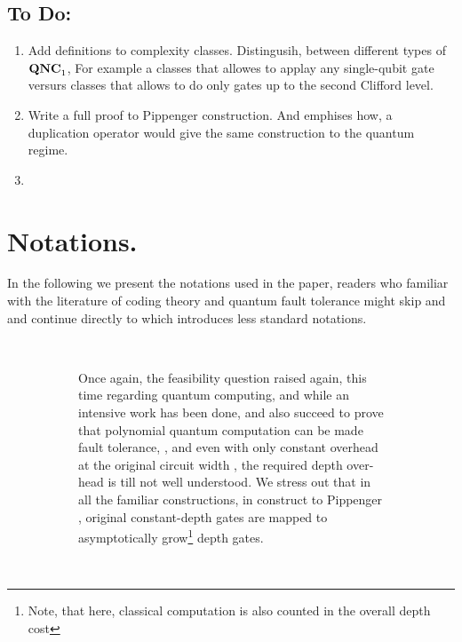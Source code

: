 \documentclass[manuscript,screen,review]{acmart}
\begin{document}
{  \subsection{To Do:}
  \begin{enumerate}
    \item Add definitions to complexity classes. Distingusih, between different types of $\mathbf{QNC}_{1}$, For example a classes that allowes to applay any single-qubit gate versurs classes that allows to do only gates up to the second Clifford level. 
    \item Write a full proof to Pippenger construction. And emphises how, a duplication operator would give the same construction to the quantum regime.  
    \item 
  \end{enumerate}

  \section{ Notations. } In the following we present the notations used in the paper, readers who familiar with the literature of coding theory and quantum fault tolerance might skip  and  and continue directly to  which introduces less standard notations. 




  \begin{figure}[h]
\begin{subfigure}[h]{0.05\textwidth}
      \
    \end{subfigure}
    \begin{subfigure}[h]{0.45\textwidth}

  Once again, the feasibility question raised again, this time regarding quantum computing, and while an intensive work has been done, and also succeed to prove that polynomial quantum computation can be made fault tolerance, \cite{aharonov1999faulttolerant},\cite{gottesman2014faulttolerant} and even with only constant overhead at the original circuit width \cite{grospellier:tel-03364419}, the required depth over-head is till not well understood. We stress out that in all the familiar constructions, in construct to Pippenger \cite{Pippenger}, original constant-depth gates are mapped to asymptotically grow\footnote{Note, that here, classical computation is also counted in the overall depth cost} depth gates. 
    \end{subfigure}
    \begin{subfigure}[h]{0.05\textwidth}
      \
    \end{subfigure}
    \begin{subfigure}[h]{0.30\textwidth} 


\end{subfigure}
\end{figure}}
\end{document}
